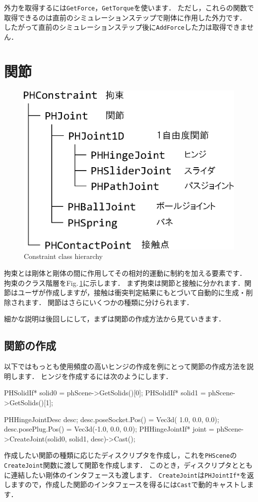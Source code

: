\KLUDGE 外力を取得するには\texttt{GetForce}，\texttt{GetTorque}を使います．
\KLUDGE ただし，これらの関数で取得できるのは直前のシミュレーションステップで剛体に作用した外力です．
\KLUDGE したがって直前のシミュレーションステップ後に\texttt{AddForce}した力は取得できません．
\KLUDGE %


\section{関節}

\begin{figure}[t]
\begin{center}
\includegraphics[width=.5\hsize]{fig/phconstraint.eps}
\end{center}
\caption{Constraint class hierarchy}
\label{fig_phconstraint}
\end{figure}

\KLUDGE 拘束とは剛体と剛体の間に作用してその相対的運動に制約を加える要素です．
\KLUDGE 拘束のクラス階層をFig.\,\ref{fig_phconstraint}に示します．
\KLUDGE まず拘束は関節と接触に分かれます．関節はユーザが作成しますが，接触は衝突判定結果にもとづいて自動的に生成・削除されます．
\KLUDGE 関節はさらにいくつかの種類に分けられます．

\KLUDGE 細かな説明は後回しにして，まずは関節の作成方法から見ていきます．

\subsection*{関節の作成}

\KLUDGE 以下ではもっとも使用頻度の高いヒンジの作成を例にとって関節の作成方法を説明します．
\KLUDGE ヒンジを作成するには次のようにします．
\begin{sourcecode}
PHSolidIf* solid0 = phScene->GetSolids()[0];
PHSolidIf* solid1 = phScene->GetSolids()[1];

PHHingeJointDesc desc;
desc.poseSocket.Pos() = Vec3d( 1.0, 0.0, 0.0);
desc.posePlug.Pos()   = Vec3d(-1.0, 0.0, 0.0);
PHHingeJointIf* joint
    = phScene->CreateJoint(solid0, solid1, desc)->Cast();
\end{sourcecode}
\KLUDGE 作成したい関節の種類に応じたディスクリプタを作成し，これを\texttt{PHScene}の\texttt{CreateJoint}関数に渡して関節を作成します．
\KLUDGE このとき，ディスクリプタとともに連結したい剛体のインタフェースも渡します．
\texttt{CreateJoint}は\texttt{PHJointIf*}を返しますので，作成した関節のインタフェースを得るには\texttt{Cast}で動的キャストします．

